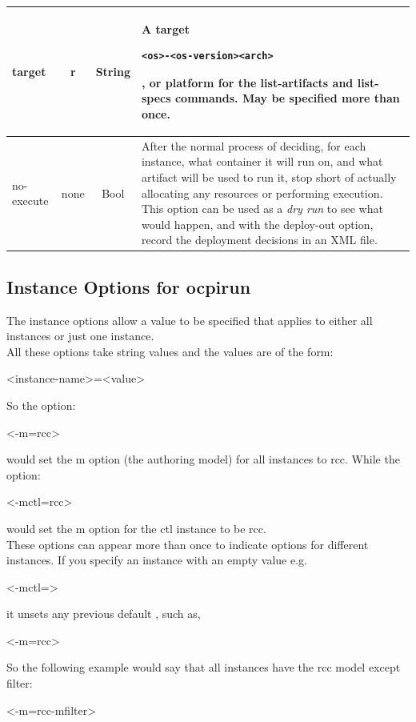 \documentclass[10pt, a4paper, oneside]{article}
\renewcommand\_{\textunderscore\allowbreak} %
\begin{document}
\begin{center}
\begin{longtable}{|l|c|c|p{11cm}|}
\hline
target & r & String & A target  \begin{verbatim}<os>-<os-version><arch>\end{verbatim}, or platform for the list-artifacts and list-specs commands.  May be specified more than once.\\  
\hline
no-execute & none & Bool & After the normal process of deciding, for each instance, what container it will run on, and what artifact will be used to run it, stop short of actually allocating any resources or performing execution.  This option can be used as a \emph{dry run} to see what would happen, and with the deploy-out option, record the deployment decisions in an XML file. \\ 
\hline
\end{longtable}
\end{center}
\subsection{Instance Options for ocpirun}\label{subsec:Instance Options for ocpirun}The instance options allow a value to be specified that applies to either all instances or just one instance. \\All these options take string values and the values are of the form:\begin{ocpixml}
<instance-name>=<value>\end{ocpixml}
So the option:\begin{ocpixml}
<-m=rcc> \end{ocpixml}
would set the m option (the authoring model) for all instances to rcc. 
While the option:\begin{ocpixml}
<-mctl=rcc> \end{ocpixml}
would set the m option for the ctl instance to be rcc. \\

These options can appear more than once to indicate options for different instances. If you specify an instance with an empty value e.g.\begin{ocpixml}
<-mctl=> \end{ocpixml} it unsets any previous default , such as, \begin{ocpixml}
<-m=rcc> \end{ocpixml}

So the following example would say that all instances have the rcc model except filter:\begin{ocpixml}
<-m=rcc-mfilter> \end{ocpixml}
\end{document}
